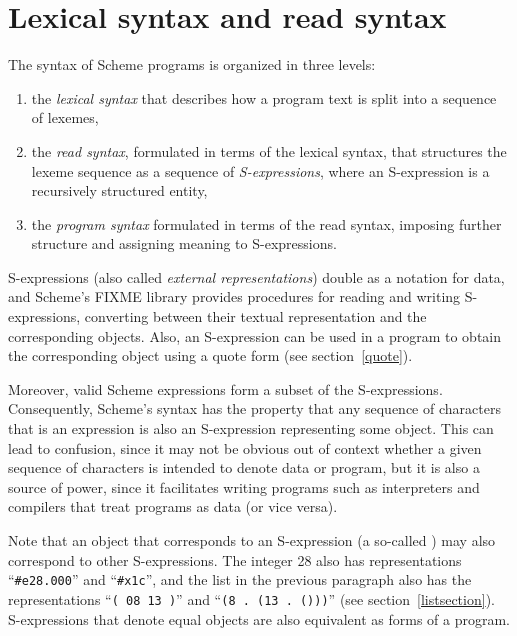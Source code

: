 
\chapter{Lexical syntax and read syntax}
\label{readsyntaxchapter}

The syntax of Scheme programs is organized in three levels:
%
\begin{enumerate}
\item the \textit{lexical syntax} that describes how a program text is split
  into a sequence of lexemes,
\item the \textit{read syntax}, formulated in terms of the lexical
  syntax, that structures the lexeme sequence as a sequence of
  \textit{S-expressions}, where an S-expression is
    a recursively structured entity,
\item the \textit{program syntax} formulated in terms of the read
  syntax, imposing further structure and assigning meaning to
  S-expressions.
\end{enumerate}
%
S-expressions (also called \textit{external
  representations}) double
as a notation for data, and Scheme's FIXME library provides procedures
for reading and writing S-expressions, converting between their
textual representation and the corresponding objects.  Also, an
S-expression can be used in a program to obtain the corresponding
object using a {\cf quote} form (see section~\ref{quote}).

Moreover, valid Scheme expressions form a subset of the S-expressions.
Consequently, Scheme's syntax has the property that any sequence of
characters that is an expression is also an S-expression representing
some object.  This can lead to confusion, since it may not be obvious
out of context whether a given sequence of characters is intended to
denote data or program, but it is also a source of power, since it
facilitates writing programs such as interpreters and compilers that
treat programs as data (or vice versa).

Note that an object that corresponds to an S-expression (a so-called
) may also correspond to other S-expressions.  The
integer 28 also has representations ``{\tt \#e28.000}'' and
``{\tt\#x1c}'', and the list in the previous paragraph also has the
representations ``{\tt( 08 13 )}'' and ``{\tt(8 .\ (13 .\ ()))}'' (see
section~\ref{listsection}).  S-expressions that denote equal
objects are also equivalent as forms of a program.

